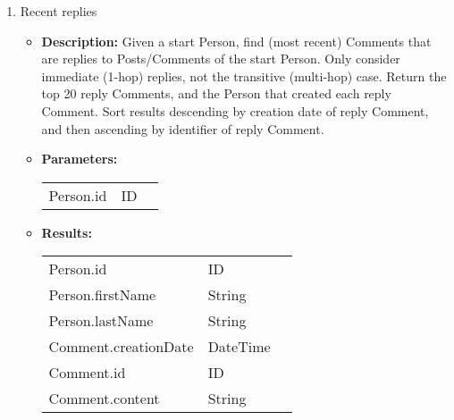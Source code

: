 {\begin{enumerate}
	\item Recent replies
	\begin{itemize}
		\item \textbf{Description:}
            Given a start Person, find (most recent) Comments that are replies
            to Posts/Comments of the start Person. Only consider immediate
            (1-hop) replies, not the transitive (multi-hop) case.  Return the
            top 20 reply Comments, and the Person that created each reply
            Comment.  Sort results descending by creation date of reply
            Comment, and then ascending by identifier of reply Comment.
		\item \textbf{Parameters:} \\
			\begin{tabular}{lll}
				Person.id 	 						& ID & \parbox[t]{20cm}{\par \strut} \\
			\end{tabular}		
		\item \textbf{Results:} \\
			\begin{tabular}{lll}
				Person.id 	 				& ID & \parbox[t]{20cm}{\par \strut} \\
				Person.firstName 	 		& String & \parbox[t]{20cm}{\par \strut} \\
				Person.lastName 	 		& String & \parbox[t]{20cm}{\par \strut} \\
				Comment.creationDate 	 	& DateTime & \parbox[t]{20cm}{\par \strut} \\
				Comment.id 	 				& ID & \parbox[t]{20cm}{\par \strut} \\
				Comment.content 	 		& String & \parbox[t]{20cm}{\par \strut} \\
			\end{tabular}		
	\end{itemize}
		

\end{enumerate}}
